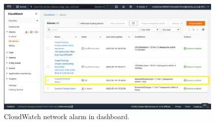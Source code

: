 \begin{figure}[!htbp]
    \centering
    \includegraphics[width=\textwidth]{resources/cloudwatch/cloudwatch-network-alarm-complete}
    \caption{CloudWatch network alarm in dashboard.}
    \label{fig:cloudwatch-network-alarm}
\end{figure}








